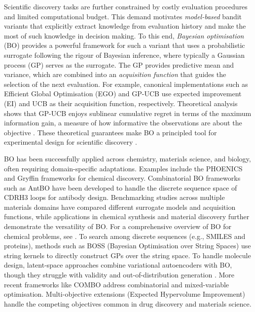 Scientific discovery tasks are further constrained by costly evaluation procedures and limited computational budget. This demand motivates \emph{model-based} bandit variants that explicitly extract knowledge from evaluation history and make the most of such knowledge in decision making. To this end, \emph{Bayesian optimisation} (BO) \citep{mockusBayesMethodsSeeking1975,jonesEfficientGlobalOptimization1998,garnettBayesianOptimization2023} provides a powerful framework for such a variant that uses a probabilistic surrogate following the rigour of Bayesian inference, where typically a Gaussian process (GP) \citep{rasmussen2006gaussian} serves as the surrogate. The GP provides predictive mean and variance, which are combined into an \emph{acquisition function} that guides the selection of the next evaluation. For example, canonical implementations such as Efficient Global Optimisation (EGO) \citep{jonesEfficientGlobalOptimization1998} and GP-UCB \citep{srinivas2010gaussian} use expected improvement (EI) and UCB \citep{auerUsingConfidenceBounds2002} as their acquisition function, respectively. Theoretical analysis shows that GP-UCB enjoys sublinear cumulative regret in terms of the maximum information gain, a measure of how informative the observations are about the objective \citep{srinivas2010gaussian}. These theoretical guarantees make BO a principled tool for experimental design for scientific discovery \citep{yuEfficientPrincipledScientific2026}.

BO has been successfully applied across chemistry, materials science, and biology, often requiring domain-specific adaptations. Examples include the PHOENICS \citep{hasePhoenicsBayesianOptimizer2018} and Gryffin \citep{haseGryffinAlgorithmBayesian2021} frameworks for chemical discovery. Combinatorial BO frameworks such as AntBO \citep{khan2022antbo} have been developed to handle the discrete sequence space of CDRH3 loops for antibody design. Benchmarking studies across multiple materials domains \citep{liangBenchmarkingPerformanceBayesian2021} have compared different surrogate models and acquisition functions, while applications in chemical synthesis \citep{shieldsBayesianReactionOptimization2021} and material discovery \citep{shoyebraihanAcceleratingMaterialDiscovery2024} further demonstrate the versatility of BO. For a comprehensive overview of BO for chemical problems, see \citep{wuRaceBottomBayesian2024}. To search among discrete sequences (e.g., SMILES and proteins), methods such as BOSS (Bayesian Optimisation over String Spaces) \citep{mossBOSSBayesianOptimization2020} use string kernels to directly construct GPs over the string space. To handle molecule design, latent-space approaches combine variational autoencoders with BO, though they struggle with validity and out-of-distribution generation \citep{griffiths2020constrained}. More recent frameworks like COMBO \citep{dreczkowskiFrameworkBenchmarksCombinatorial2023} address combinatorial and mixed-variable optimisation. Multi-objective extensions (Expected Hypervolume Improvement) \citep{ponweiserMultiobjectiveOptimizationLimited2008, daulton2021parallel} handle the competing objectives common in drug discovery and materials science.

